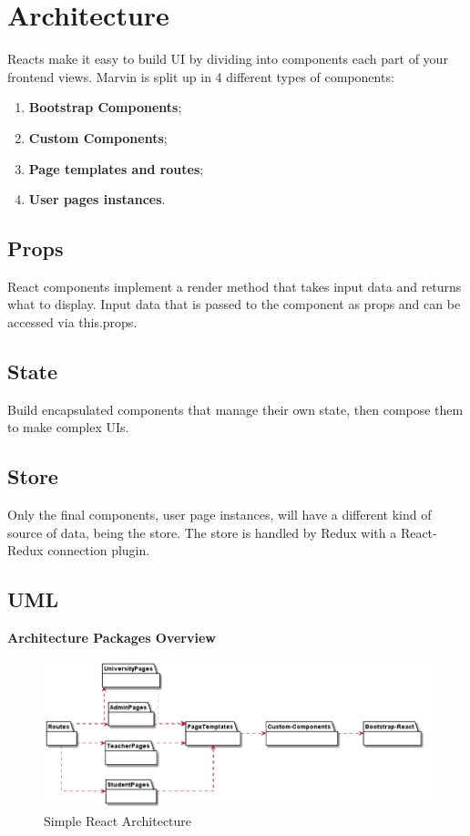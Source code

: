 \documentclass[../react.tex]{subfiles}
\begin{document}
	
	\section{Architecture}

	Reacts make it easy to build UI by dividing into components each part of your frontend views.
	Marvin is split up in 4 different types of components:
	\begin{enumerate} 
		\item \textbf{Bootstrap Components};
		\item \textbf{Custom Components};
		\item \textbf{Page templates and routes};
		\item \textbf{User pages instances}.
	\end{enumerate} 

	\subsection{Props}
	React components implement a render method that takes input data and returns what to display.
	Input data that is passed to the component as props and can be accessed via this.props.

	\subsection{State}
	Build encapsulated components that manage their own state, then compose them to make complex UIs.

	\subsection{Store}
	Only the final components, user page instances, will have a different kind of source of data, being the store.
	The store is handled by Redux with a React-Redux connection plugin.
	
	\subsection{UML} %
	
	\textbf{Architecture Packages Overview}
	\begin{figure}[H]
		\centering
		\includegraphics[width=1\linewidth]{"diagrammi/react/simplearch"}
		\caption{Simple React Architecture}
		\label{fig:Simple React Architecture}
	\end{figure}
	
\end{document}
